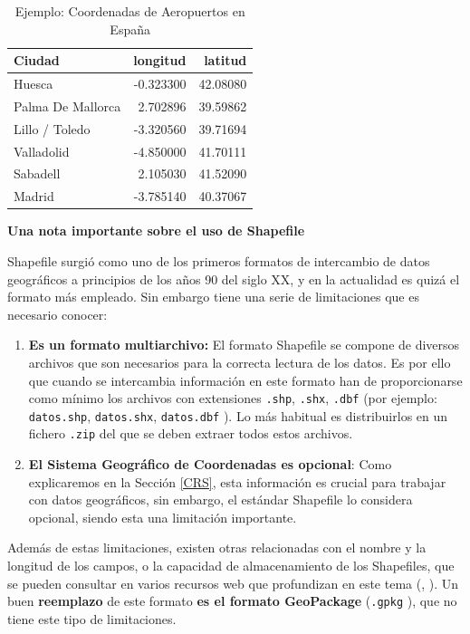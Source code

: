 \documentclass[
]{book}
\theoremstyle{definition}
\theoremstyle{definition}
\theoremstyle{definition}
\theoremstyle{definition}
\theoremstyle{remark}
\begin{document}
\begin{table}

\caption{\label{tab:unnamed-chunk-10}Ejemplo: Coordenadas de Aeropuertos en España}
\centering
\begin{tabular}[t]{l|r|r}
\hline
Ciudad & longitud & latitud\\
\hline
Huesca & -0.323300 & 42.08080\\
\hline
Palma De Mallorca & 2.702896 & 39.59862\\
\hline
Lillo / Toledo & -3.320560 & 39.71694\\
\hline
Valladolid & -4.850000 & 41.70111\\
\hline
Sabadell & 2.105030 & 41.52090\\
\hline
Madrid & -3.785140 & 40.37067\\
\hline
\end{tabular}
\end{table}

\textbf{Una nota importante sobre el uso de Shapefile}

Shapefile surgió como uno de los primeros formatos de intercambio de datos
geográficos a principios de los años 90 del siglo XX, y en la actualidad es
quizá el formato más empleado. Sin embargo tiene una serie de limitaciones que
es necesario conocer:

\begin{enumerate}
\def\labelenumi{\arabic{enumi}.}
\item
  \textbf{Es un formato multiarchivo:} El formato Shapefile se compone de diversos
  archivos que son necesarios para la correcta lectura de los datos. Es por
  ello que cuando se intercambia información en este formato han de
  proporcionarse como mínimo los archivos con extensiones \texttt{.shp}, \texttt{.shx},
  \texttt{.dbf} (por ejemplo: \texttt{datos.shp}, \texttt{datos.shx}, \texttt{datos.dbf} ). Lo más
  habitual es distribuirlos en un fichero \texttt{.zip} del que se deben extraer
  todos estos archivos.
\item
  \textbf{El Sistema Geográfico de Coordenadas es opcional}: Como explicaremos en
  la Sección \ref{CRS}, esta información es crucial para trabajar con datos
  geográficos, sin embargo, el estándar Shapefile lo considera opcional,
  siendo esta una limitación importante.
\end{enumerate}

Además de estas limitaciones, existen otras relacionadas con el nombre y la
longitud de los campos, o la capacidad de almacenamiento de los Shapefiles, que
se pueden consultar en varios recursos web que profundizan en este tema
(\citet{morales2012}, \citet{opengeolabs2017}). Un buen \textbf{reemplazo} de este formato \textbf{es el
formato GeoPackage} (\texttt{.gpkg} ), que no tiene este tipo de limitaciones.
\end{document}
